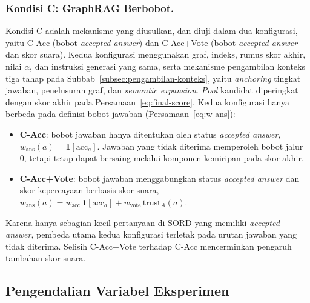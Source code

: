 \subsubsection{Kondisi C: GraphRAG Berbobot.}
Kondisi C adalah mekanisme yang diusulkan, dan diuji dalam dua konfigurasi, yaitu C-Acc (bobot \emph{accepted answer}) dan C-Acc+Vote (bobot \emph{accepted answer} dan skor suara). Kedua konfigurasi menggunakan graf, indeks, rumus skor akhir, nilai $\alpha$, dan instruksi generasi yang sama, serta mekanisme pengambilan konteks tiga tahap pada Subbab~\ref{subsec:pengambilan-konteks}, yaitu \emph{anchoring} tingkat jawaban, penelusuran graf, dan \emph{semantic expansion}. \emph{Pool} kandidat diperingkat dengan skor akhir pada Persamaan~\eqref{eq:final-score}. Kedua konfigurasi hanya berbeda pada definisi bobot jawaban (Persamaan~\eqref{eq:w-ans}):
\begin{itemize}
    \item \textbf{C-Acc}: bobot jawaban hanya ditentukan oleh status \emph{accepted answer}, $w_{\mathrm{ans}}(a)=\mathbf{1}[\mathrm{acc}_a]$. Jawaban yang tidak diterima memperoleh bobot jalur 0, tetapi tetap dapat bersaing melalui komponen kemiripan pada skor akhir.
    \item \textbf{C-Acc+Vote}: bobot jawaban menggabungkan status \emph{accepted answer} dan skor kepercayaan berbasis skor suara, $w_{\mathrm{ans}}(a)=w_{\mathrm{acc}}\,\mathbf{1}[\mathrm{acc}_a]+w_{\mathrm{vote}}\,\mathrm{trust}_A(a)$.
\end{itemize}
Karena hanya sebagian kecil pertanyaan di SORD yang memiliki \emph{accepted answer}, pembeda utama kedua konfigurasi terletak pada urutan jawaban yang tidak diterima. Selisih C-Acc+Vote terhadap C-Acc mencerminkan pengaruh tambahan skor suara.

\subsection{Pengendalian Variabel Eksperimen}
\label{subsec:pengendalian-variabel}

